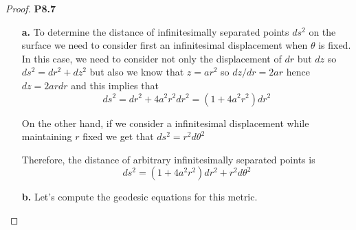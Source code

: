 \documentclass[11pt]{article}
\theoremstyle{definition}
\begin{document}
\begin{proof}{\textbf{P8.7}}
    \begin{itemize}
        \item [\textbf{a.}] To determine the distance of infinitesimally
        separated points $ds^2$ on the surface we need to consider first an
        infinitesimal displacement when $\theta$ is fixed.
        In this case, we need to consider not only the displacement of $dr$ but
        $dz$ so $ds^2 = dr^2 + dz^2$ but also we know that $z = ar^2$ so
        $dz/dr = 2ar$ hence $dz = 2ardr$ and this implies that 
        $$ds^2 = dr^2 + 4a^2r^2dr^2 = (1 + 4a^2r^2)dr^2$$

        On the other hand, if we consider a infinitesimal displacement while
        maintaining $r$ fixed we get that $ds^2 = r^2d\theta^2$

        Therefore, the distance of arbitrary infinitesimally separated points is
        $$ds^2 = (1 + 4a^2r^2)dr^2 + r^2d\theta^2$$

        \item [\textbf{b.}] Let's compute the geodesic equations for this
        metric.


\end{itemize}
\end{proof}
\end{document}
